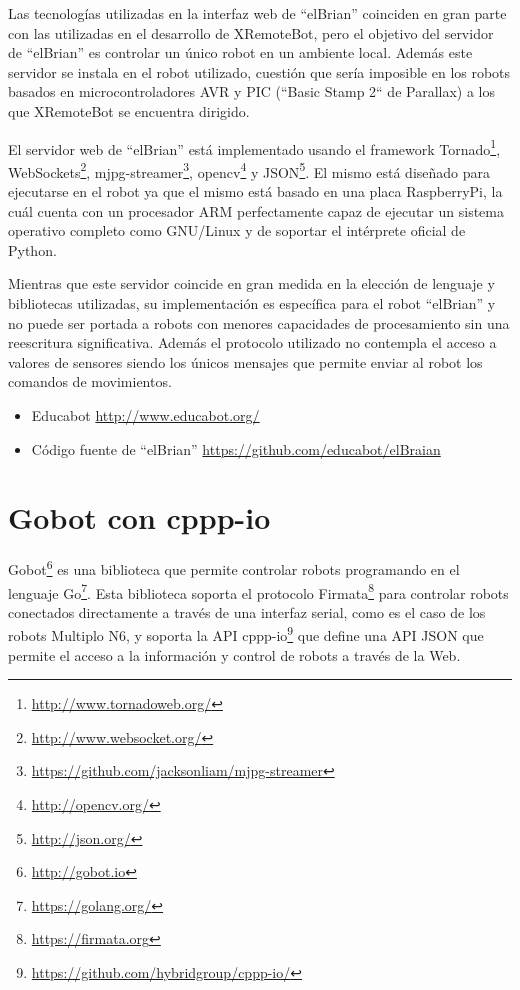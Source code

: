 Las tecnologías utilizadas en la interfaz web de ``elBrian'' coinciden en gran
parte con las utilizadas en el desarrollo de XRemoteBot, pero el objetivo del
servidor de ``elBrian'' es controlar un único robot en un ambiente local.
Además este servidor
se instala en el robot utilizado,  cuestión que sería imposible en los
robots basados en
microcontroladores AVR y PIC (``Basic Stamp 2`` de Parallax)
a los que XRemoteBot se encuentra dirigido.


El servidor web de ``elBrian'' está implementado usando el framework
Tornado\footnote{\url{http://www.tornadoweb.org/}},
WebSockets\footnote{\url{http://www.websocket.org/}},
mjpg-streamer\footnote{\url{https://github.com/jacksonliam/mjpg-streamer}},
opencv\footnote{\url{http://opencv.org/}}
y JSON\footnote{\url{http://json.org/}}.
El mismo está diseñado para ejecutarse
en el robot ya que el mismo está basado en una placa RaspberryPi, la cuál
cuenta con un procesador ARM perfectamente capaz de ejecutar un sistema
operativo completo como GNU/Linux y de soportar el intérprete oficial de Python.

Mientras que este servidor coincide en gran medida en la elección de lenguaje
y bibliotecas utilizadas, su implementación es específica para el robot ``elBrian''
y no puede ser portada a robots con menores capacidades de procesamiento
sin una reescritura significativa. Además el protocolo utilizado no contempla
el acceso a valores de sensores siendo los únicos mensajes que permite enviar
al robot los comandos de movimientos.

\begin{itemize}
    \item Educabot \url{http://www.educabot.org/}
    \item Código fuente de ``elBrian'' \url{https://github.com/educabot/elBraian}
\end{itemize}

\section{Gobot con cppp-io}

Gobot\footnote{\url{http://gobot.io}}
es una biblioteca que permite controlar robots programando en el lenguaje
Go\footnote{\url{https://golang.org/}}. Esta biblioteca soporta el
protocolo Firmata\footnote{\url{https://firmata.org}}
para controlar robots
conectados directamente a través de una interfaz serial, como es el caso
de los robots Multiplo N6, y soporta la API
cppp-io\footnote{\url{https://github.com/hybridgroup/cppp-io/}}
que define una API JSON
que permite el acceso a la información y control de robots a través de la Web.

